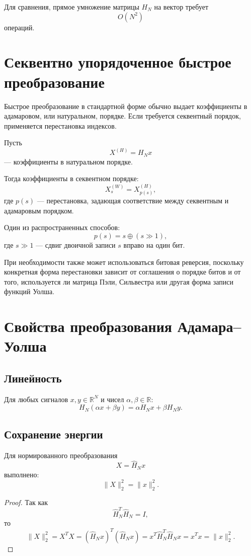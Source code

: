\documentclass[12pt,a4paper]{article}
\begin{document}
Для сравнения, прямое умножение матрицы $H_N$ на вектор требует
\[
    O(N^2)
\]
операций.

\section{Секвентно упорядоченное быстрое преобразование}

Быстрое преобразование в стандартной форме обычно выдает коэффициенты в адамаровом, или натуральном, порядке. Если требуется секвентный порядок, применяется перестановка индексов.

Пусть
\[
    X^{(H)}=H_Nx
\]
--- коэффициенты в натуральном порядке.

Тогда коэффициенты в секвентном порядке:
\[
    X^{(W)}_s = X^{(H)}_{p(s)},
\]
где $p(s)$ --- перестановка, задающая соответствие между секвентным и адамаровым порядком.

Один из распространенных способов:
\[
    p(s)=s\oplus(s\gg 1),
\]
где $s\gg 1$ --- сдвиг двоичной записи $s$ вправо на один бит.

При необходимости также может использоваться битовая реверсия, поскольку конкретная форма перестановки зависит от соглашения о порядке битов и от того, используется ли матрица Пэли, Сильвестра или другая форма записи функций Уолша.

\section{Свойства преобразования Адамара--Уолша}

\subsection{Линейность}

Для любых сигналов $x,y\in\mathbb{R}^N$ и чисел $\alpha,\beta\in\mathbb{R}$:
\[
    H_N(\alpha x+\beta y)
    =
    \alpha H_Nx+\beta H_Ny.
\]

\subsection{Сохранение энергии}

Для нормированного преобразования
\[
    X=\widehat{H}_Nx
\]
выполнено:
\[
    \|X\|_2^2=\|x\|_2^2.
\]

\begin{proof}
Так как
\[
    \widehat{H}_N^T\widehat{H}_N=I,
\]
то
\[
    \|X\|_2^2
    =
    X^TX
    =
    (\widehat{H}_Nx)^T(\widehat{H}_Nx)
    =
    x^T\widehat{H}_N^T\widehat{H}_Nx
    =
    x^Tx
    =
    \|x\|_2^2.
\]
\end{proof}
\end{document}
